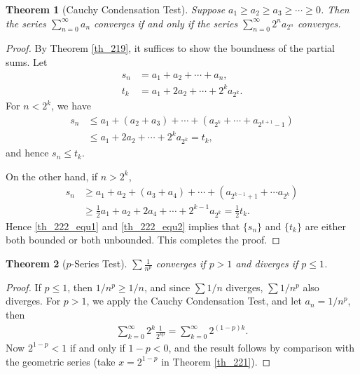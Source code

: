 \documentclass[10pt]{book}
\newtheorem{theorem}{Theorem}[chapter]
\theoremstyle{definition}
\numberwithin{equation}{chapter}
\begin{document}
\begin{theorem}[Cauchy Condensation Test]\label{th_222}
Suppose $a_1 \geq a_2 \geq a_3 \geq \cdots \geq 0$. Then the series $\sum^\infty_{n=0} a_n$ converges if and only if the series $\sum^\infty_{n=0} 2^n a_{2^n}$ converges.
\end{theorem}
\begin{proof}
By Theorem \ref{th_219}, it suffices to show the boundness of the partial sums. Let
\begin{align*}
    s_n & = a_1 + a_2 + \cdots + a_n, \\
    t_k & = a_1 + 2a_2 + \cdots + 2^k a_{2^k}.
\end{align*}
For $n < 2^k$, we have
\begin{align}\label{th_222_equ1}
    s_n & \leq a_1 + (a_2 + a_3) + \cdots + (a_{2^k} + \cdots + a_{2^{k+1}-1}) \\
    & \leq a_1 + 2a_2 + \cdots + 2^k a_{2^k} = t_k,
\end{align}
and hence $s_n \leq t_k$. 

On the other hand, if $n > 2^k$,
\begin{align}\label{th_222_equ2}
    s_n & \geq a_1 + a_2 + (a_3 + a_4) + \cdots + (a_{2^{k-1}+1} + \cdots a_{2^k}) \\
    & \geq \frac{1}{2}a_1 + a_2 + 2 a_4 + \cdots + 2^{k-1} a_{2^k} = \frac{1}{2} t_k.
\end{align}
Hence \eqref{th_222_equ1} and \eqref{th_222_equ2} implies that $\{s_n\}$ and $\{t_k\}$ are either both bounded or both unbounded. This completes the proof.
\end{proof}

\medskip

\begin{theorem}[$p$-Series Test]\label{th_223}
$\displaystyle \sum \frac{1}{n^p}$ converges if $p > 1$ and diverges if $p \leq 1$.
\end{theorem}
\begin{proof}
If $p \leq 1$, then $1/n^p \geq 1/n$, and since $\sum 1/n$ diverges, $\sum 1/n^p$ also diverges. For $p > 1$, we apply the Cauchy Condensation Test, and let $a_n = 1/n^p$, then
\begin{align*}
    \sum^\infty_{k=0} 2^k \frac{1}{2^{kp}} = \sum^\infty_{k=0} 2^{(1-p)k}.
\end{align*}
Now $2^{1-p} < 1$ if and only if $1 - p < 0$, and the result follows by comparison with the geometric series (take $x = 2^{1-p}$ in Theorem \ref{th_221}).
\end{proof}
\end{document}
